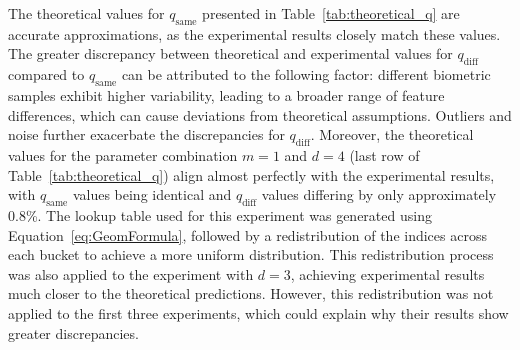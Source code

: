 The theoretical values for \(q_{\text{same}}\) presented in Table~\ref{tab:theoretical_q} are accurate approximations, as the experimental results closely match these values. The greater discrepancy between theoretical and experimental values for \(q_{\text{diff}}\) compared to \(q_{\text{same}}\) can be attributed to the following factor: different biometric samples exhibit higher variability, leading to a broader range of feature differences, which can cause deviations from theoretical assumptions. Outliers and noise further exacerbate the discrepancies for \(q_{\text{diff}}\). Moreover, the theoretical values for the parameter combination \(m=1\) and \(d=4\) (last row of Table~\ref{tab:theoretical_q}) align almost perfectly with the experimental results, with \(q_{\text{same}}\) values being identical and \(q_{\text{diff}}\) values differing by only approximately 0.8\%. The lookup table used for this experiment was generated using Equation~\ref{eq:GeomFormula}, followed by a redistribution of the indices across each bucket to achieve a more uniform distribution. This redistribution process was also applied to the experiment with \(d = 3\), achieving experimental results much closer to the theoretical predictions. However, this redistribution was not applied to the first three experiments, which could explain why their results show greater discrepancies.




